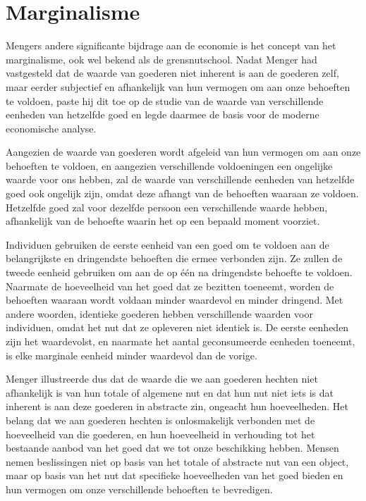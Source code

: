 \section{Marginalisme}

Mengers andere significante bijdrage aan de economie is het concept van het marginalisme, ook wel bekend als de grensnutschool. Nadat Menger had vastgesteld dat de waarde van goederen niet inherent is aan de goederen zelf, maar eerder subjectief en afhankelijk van hun vermogen om aan onze behoeften te voldoen, paste hij dit toe op de studie van de waarde van verschillende eenheden van hetzelfde goed en legde daarmee de basis voor de moderne economische analyse. 

Aangezien de waarde van goederen wordt afgeleid van hun vermogen om aan onze behoeften te voldoen, en aangezien verschillende voldoeningen een ongelijke waarde voor ons hebben, zal de waarde van verschillende eenheden van hetzelfde goed ook ongelijk zijn, omdat deze afhangt van de behoeften waaraan ze voldoen. Hetzelfde goed zal voor dezelfde persoon een verschillende waarde hebben, afhankelijk van de behoefte waarin het op een bepaald moment voorziet.

Individuen gebruiken de eerste eenheid van een goed om te voldoen aan de belangrijkste en dringendste behoeften die ermee verbonden zijn. Ze zullen de tweede eenheid gebruiken om aan de op één na dringendste behoefte te voldoen. Naarmate de hoeveelheid van het goed dat ze bezitten toeneemt, worden de behoeften waaraan wordt voldaan minder waardevol en minder dringend. Met andere woorden, identieke goederen hebben verschillende waarden voor individuen, omdat het nut dat ze opleveren niet identiek is. De eerste eenheden zijn het waardevolst, en naarmate het aantal geconsumeerde eenheden toeneemt, is elke marginale eenheid minder waardevol dan de vorige.

Menger illustreerde dus dat de waarde die we aan goederen hechten niet afhankelijk is van hun totale of algemene nut en dat hun nut niet iets is dat inherent is aan deze goederen in abstracte zin, ongeacht hun hoeveelheden. Het belang dat we aan goederen hechten is onlosmakelijk verbonden met de hoeveelheid van die goederen, en hun hoeveelheid in verhouding tot het bestaande aanbod van het goed dat we tot onze beschikking hebben. Mensen nemen beslissingen niet op basis van het totale of abstracte nut van een object, maar op basis van het nut dat specifieke hoeveelheden van het goed bieden en hun vermogen om onze verschillende behoeften te bevredigen.

